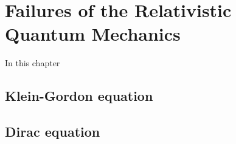\chapter{Failures of the Relativistic Quantum Mechanics}

In this chapter

\section{}

\section{Klein-Gordon equation}

\section{Dirac equation}
